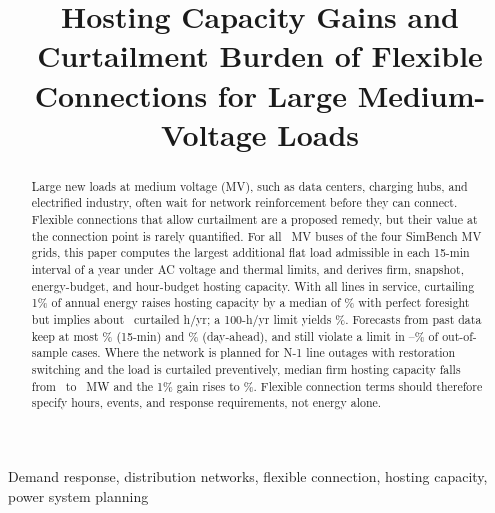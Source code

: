 \documentclass[conference,letterpaper]{IEEEtran}
\begin{document}
\title{Hosting Capacity Gains and Curtailment Burden of Flexible Connections for Large Medium-Voltage Loads}

\author{
}

\maketitle

\begin{abstract}
Large new loads at medium voltage (MV), such as data centers, charging hubs, and electrified industry, often wait for network reinforcement before they can connect. Flexible connections that allow curtailment are a proposed remedy, but their value at the connection point is rarely quantified. For all \nBus~MV buses of the four SimBench MV grids, this paper computes the largest additional flat load admissible in each 15-min interval of a year under AC voltage and thermal limits, and derives firm, snapshot, energy-budget, and hour-budget hosting capacity. With all lines in service, curtailing 1\% of annual energy raises hosting capacity by a median of \poolGcmed\% with perfect foresight but implies about \poolGchrs~curtailed h/yr; a 100-h/yr limit yields \poolHOZZmed\%. Forecasts from past data keep at most \fcBestFifteengain\% (15-min) and \fcBestDagain\% (day-ahead), and still violate a limit in \fcRangeFifteenviolLo--\fcRangeDaviolHi\% of out-of-sample cases. Where the network is planned for N-1 line outages with restoration switching and the load is curtailed preventively, median firm hosting capacity falls from \sensBasefirm~to \sensNmofirm~MW and the 1\% gain rises to \sensNmogO\%. Flexible connection terms should therefore specify hours, events, and response requirements, not energy alone.
\end{abstract}

\begin{IEEEkeywords}
Demand response, distribution networks, flexible connection, hosting capacity, power system planning
\end{IEEEkeywords}
\end{document}
